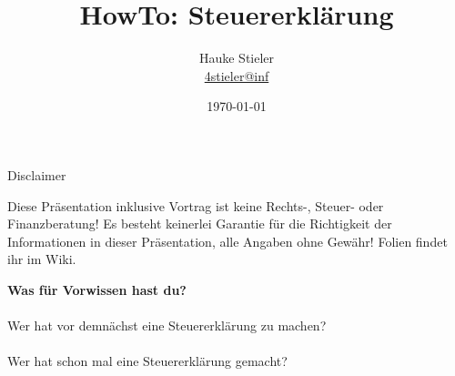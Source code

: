 \documentclass{beamer}
\author[Hauke Stieler]{Hauke Stieler\\\href{mailto:4stieler@informatik.uni-hamburg.de}{4stieler@inf}}
\title{HowTo: Steuererklärung}
\date{\today}
\begin{document}
	{
		\addtocounter{page}{-1}
		\frame{}
	}

	{
		\maketitle
		\addtocounter{page}{-1}
	}
	
	\begin{frame}{Disclaimer}
		\begin{center}
			Diese Präsentation inklusive Vortrag ist keine Rechts-, Steuer- oder Finanzberatung!\n\pause
			Es besteht keinerlei Garantie für die Richtigkeit der Informationen in dieser Präsentation, alle Angaben ohne Gewähr!\n\pause
			Folien findet ihr im Wiki.
		\end{center}
	\end{frame}

	\begin{frame}
		\begin{center}
			\textbf{Was für Vorwissen hast du?}\\\pause
			\hfill\\
			Wer hat vor demnächst eine Steuererklärung zu machen?\\\pause
			\hfill\\
			Wer hat schon mal eine Steuererklärung gemacht?
		\end{center}
	\end{frame}
\end{document}
